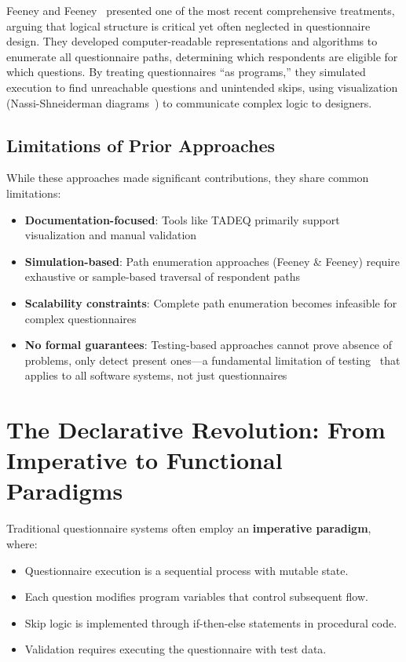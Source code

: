 Feeney and Feeney~\cite{feeney2019logical} presented one of the most recent comprehensive treatments, arguing that logical structure is critical yet often neglected in questionnaire design. They developed computer-readable representations and algorithms to enumerate all questionnaire paths, determining which respondents are eligible for which questions. By treating questionnaires ``as programs,'' they simulated execution to find unreachable questions and unintended skips, using visualization (Nassi-Shneiderman diagrams~\cite{nassi1973flowchart}) to communicate complex logic to designers.

\subsection{Limitations of Prior Approaches}

While these approaches made significant contributions, they share common limitations:

\begin{itemize}
    \item \textbf{Documentation-focused}: Tools like TADEQ primarily support visualization and manual validation
    \item \textbf{Simulation-based}: Path enumeration approaches (Feeney \& Feeney) require exhaustive or sample-based traversal of respondent paths
    \item \textbf{Scalability constraints}: Complete path enumeration becomes infeasible for complex questionnaires
    \item \textbf{No formal guarantees}: Testing-based approaches cannot prove absence of problems, only detect present ones—a fundamental limitation of testing~\cite{dijkstra1970notes} that applies to all software systems, not just questionnaires
\end{itemize}

\section{The Declarative Revolution: From Imperative to Functional Paradigms}

Traditional questionnaire systems often employ an \textbf{imperative paradigm}, where:

\begin{itemize}
    \item Questionnaire execution is a sequential process with mutable state.
    \item Each question modifies program variables that control subsequent flow.
    \item Skip logic is implemented through if-then-else statements in procedural code.
    \item Validation requires executing the questionnaire with test data.
\end{itemize}

